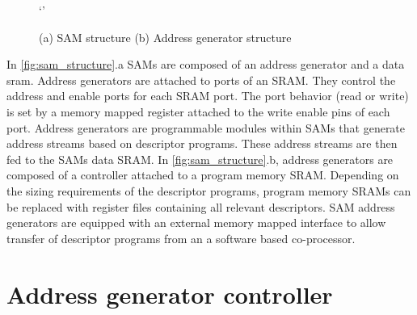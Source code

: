 \begin{figure}
    \centering`'
    \caption{(a) SAM structure (b) Address generator structure}
    \label{fig:sam_structure}
\end{figure}

In \autoref{fig:sam_structure}.a SAMs are composed of an address generator and a
data sram. Address generators are attached to ports of an SRAM. They control the
address and enable ports for each SRAM port. The port behavior (read or write)
is set by a memory mapped register attached to the write enable pins of each
port. Address generators are programmable modules within SAMs that generate address
streams based on descriptor programs. These address streams are then fed to the
SAMs data SRAM. In \autoref{fig:sam_structure}.b, address generators are
composed of a controller attached to a program memory SRAM. Depending on the
sizing requirements of the descriptor programs, program memory SRAMs can be
replaced with register files containing all relevant descriptors. SAM address
generators are equipped with an external memory mapped interface to allow
transfer of descriptor programs from an a software based co-processor.

\section{Address generator controller}
\label{chap:data_orchestration:sams:controller}

